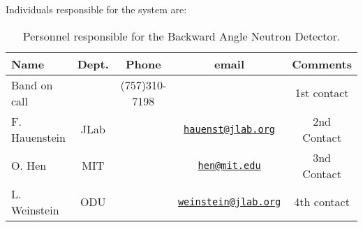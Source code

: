 Individuals responsible for the system are:

\begin{table}[!htb]
 \centering
 \begin{tabular}{|l|c|c|c|c|}
\hline
 Name                 & Dept.     & Phone                             & email                                                                                                    & Comments \\ \hline
 Band on call      &               &     (757)310-7198            &                                                                                                              & 1st contact \\ \hline
 F.  Hauenstein   & JLab       &                                        & \href{mailto:hauenst@jlab.org}{\nolinkurl{hauenst@jlab.org}}            & 2nd Contact \\ \hline
  O. Hen               & MIT        &                                        & \href{mailto:hen@mit.edu}{\nolinkurl{hen@mit.edu}}                          & 3nd Contact \\ \hline
 L. Weinstein      & ODU      &                                        & \href{mailto:weinstein@jlab.org}{\nolinkurl{weinstein@jlab.org}}          & 4th contact  \\ \hline

 \end{tabular}
\caption{Personnel responsible for the Backward Angle Neutron Detector.} 
\label{tb:band}
\end{table}
